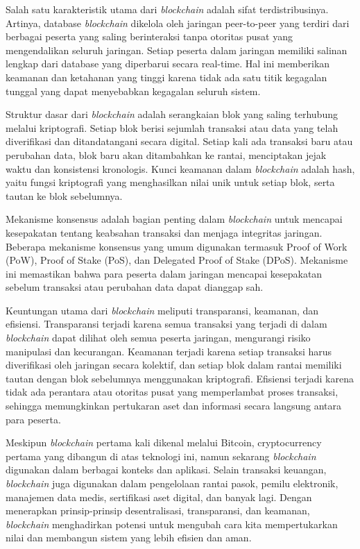 Salah satu karakteristik utama dari \emph{blockchain} adalah sifat terdistribusinya. Artinya, database \emph{blockchain} dikelola oleh jaringan peer-to-peer yang terdiri dari berbagai peserta yang saling berinteraksi
tanpa otoritas pusat yang mengendalikan seluruh jaringan. Setiap peserta dalam jaringan memiliki salinan lengkap dari database yang diperbarui secara real-time. Hal ini memberikan keamanan dan ketahanan
yang tinggi karena tidak ada satu titik kegagalan tunggal yang dapat menyebabkan kegagalan seluruh sistem.

Struktur dasar dari \emph{blockchain} adalah serangkaian blok yang saling terhubung melalui kriptografi. Setiap blok berisi sejumlah transaksi atau data yang telah diverifikasi dan ditandatangani secara digital.
Setiap kali ada transaksi baru atau perubahan data, blok baru akan ditambahkan ke rantai, menciptakan jejak waktu dan konsistensi kronologis. Kunci keamanan dalam \emph{blockchain} adalah hash, yaitu fungsi
kriptografi yang menghasilkan nilai unik untuk setiap blok, serta tautan ke blok sebelumnya.

Mekanisme konsensus adalah bagian penting dalam \emph{blockchain} untuk mencapai kesepakatan tentang keabsahan transaksi dan menjaga integritas jaringan. Beberapa mekanisme konsensus yang umum digunakan
termasuk Proof of Work (PoW), Proof of Stake (PoS), dan Delegated Proof of Stake (DPoS). Mekanisme ini memastikan bahwa para peserta dalam jaringan mencapai kesepakatan sebelum transaksi atau perubahan data dapat dianggap sah. \parencite{swan2015blockchain}

Keuntungan utama dari \emph{blockchain} meliputi transparansi, keamanan, dan efisiensi. Transparansi terjadi karena semua transaksi yang terjadi di dalam \emph{blockchain} dapat dilihat oleh semua peserta jaringan,
mengurangi risiko manipulasi dan kecurangan. Keamanan terjadi karena setiap transaksi harus diverifikasi oleh jaringan secara kolektif, dan setiap blok dalam rantai memiliki tautan dengan blok sebelumnya menggunakan kriptografi.
Efisiensi terjadi karena tidak ada perantara atau otoritas pusat yang memperlambat proses transaksi, sehingga memungkinkan pertukaran aset dan informasi secara langsung antara para peserta.

Meskipun \emph{blockchain} pertama kali dikenal melalui Bitcoin, cryptocurrency pertama yang dibangun di atas teknologi ini, namun sekarang \emph{blockchain} digunakan dalam berbagai konteks dan aplikasi.
Selain transaksi keuangan, \emph{blockchain} juga digunakan dalam pengelolaan rantai pasok, pemilu elektronik, manajemen data medis, sertifikasi aset digital, dan banyak lagi.
Dengan menerapkan prinsip-prinsip desentralisasi, transparansi, dan keamanan, \emph{blockchain} menghadirkan potensi untuk mengubah cara kita mempertukarkan nilai dan membangun sistem yang lebih efisien dan aman. \parencite{tapscott2016blockchain}

